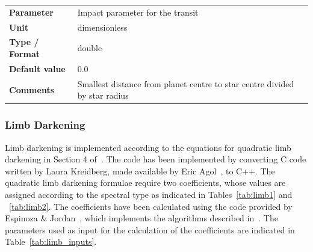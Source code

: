 \documentclass[11pt]{article}      %
\def\HCode#1{}
\def\htmlanchor#1{\HCode{<a id="#1"></a>}}
\begin{document}
\begin{table}[hb]
  \htmlanchor{impactParameter}
  \begin{tabular}{| l | p{13cm} |}
    \hline 
    {\bf Parameter} & Impact parameter for the transit\\
    {\bf Unit} & dimensionless\\
    {\bf Type / Format} & double\\
    {\bf Default value} & 0.0\\
    {\bf Comments} & Smallest distance from planet centre to star centre divided by star radius\\
    \hline
  \end{tabular}
  \bigskip

  \label{tab:transit}
\end{table}

\clearpage 
\htmlanchor{limbDarkening}
\subsubsection{Limb Darkening}

Limb darkening is implemented according to the equations for quadratic limb darkening in Section 4 of~\cite{MandelAgol}.  The code has been implemented by converting C code written by Laura Kreidberg, made available by Eric Agol~\cite{AgolCode}, to C++.  The quadratic limb darkening formulae require two coefficients, whose values are assigned according to the spectral type as indicated in Tables~\ref{tab:limb1} and ~\ref{tab:limb2}. The coefficients have been calculated using the code provided by Espinoza \& Jordan~\cite{limbDarkening_code}, which implements the algorithms described in~\cite{limbDarkening}. The parameters used as input for the calculation of the coefficients are indicated in Table~\ref{tab:limb_inputs}.
\end{document}
